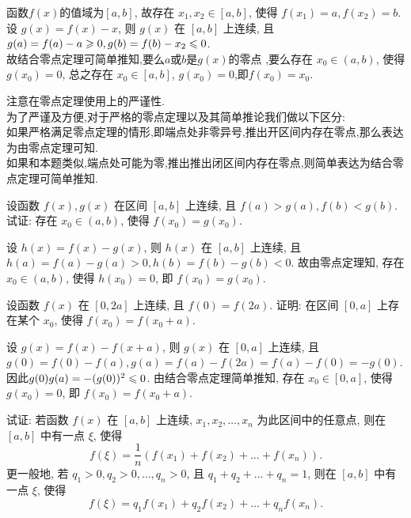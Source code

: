 \begin{solution}
    函数$f(x)$的值域为$[a,b]$, 故存在 $x_1, x_2 \in [a,b]$, 使得 $f(x_1) = a, f(x_2) = b$. 设 $g(x) = f(x) - x$, 则 $g(x)$ 在 $[a,b]$ 上连续, 且 $g(a) = f(a) - a \geqslant 0, g(b) = f(b) - x_2 \leqslant 0$. \\
    故结合零点定理可简单推知,要么$a$或$b$是$g(x)$的零点 ,要么存在 $x_0 \in (a,b)$, 使得 $g(x_0) = 0$, 总之存在 $x_0 \in [a,b]$, $g(x_0)=0$,即$f(x_0) = x_0$.

    \begin{remark}
    注意在零点定理使用上的严谨性.\\为了严谨及方便,对于严格的零点定理以及其简单推论我们做以下区分:\\
    如果严格满足零点定理的情形,即端点处非零异号,推出开区间内存在零点,那么表达为由零点定理可知.\\
    如果和本题类似,端点处可能为零,推出推出闭区间内存在零点,则简单表达为结合零点定理可简单推知.
\end{remark}
\end{solution}


\begin{exercise}[2.2.5]
    设函数 $f(x), g(x)$ 在区间 $[a,b]$ 上连续, 且 $f(a) > g(a), f(b) < g(b)$. 试证: 存在 $x_0 \in (a,b)$, 使得 $f(x_0)=g(x_0)$.
\end{exercise}

\begin{solution}
    设 $h(x) = f(x) - g(x)$, 则 $h(x)$ 在 $[a,b]$ 上连续, 且 $h(a) = f(a) - g(a) > 0, h(b) = f(b) - g(b) < 0$. 故由零点定理知, 存在 $x_0 \in (a,b)$, 使得 $h(x_0) = 0$, 即 $f(x_0) = g(x_0)$.
\end{solution}


\begin{exercise}[2.2.6]
    设函数 $f(x)$ 在 $[0, 2a]$ 上连续, 且 $f(0)=f(2a)$. 证明: 在区间 $[0,a]$ 上存在某个 $x_0$, 使得 $f(x_0) = f(x_0+a)$.
\end{exercise}

\begin{solution}
    设 $g(x) = f(x) - f(x+a)$, 则 $g(x)$ 在 $[0,a]$ 上连续, 且 $g(0) = f(0) - f(a), g(a) = f(a) - f(2a) = f(a) - f(0) = -g(0)$. 因此$g(0) g(a) = -(g(0))^2 \leqslant 0$. 由结合零点定理简单推知, 存在 $x_0 \in [0,a]$, 使得 $g(x_0) = 0$, 即 $f(x_0) = f(x_0+a)$.
\end{solution}

\begin{exercise}[2.2.7]
    试证: 若函数 $f(x)$ 在 $[a,b]$ 上连续, $x_1, x_2, \dots, x_n$ 为此区间中的任意点, 则在 $[a,b]$ 中有一点 $\xi$, 使得
    $$ f(\xi) = \frac{1}{n}(f(x_1)+f(x_2)+\dots+f(x_n)). $$
    更一般地, 若 $q_1 > 0, q_2 > 0, \dots, q_n > 0$, 且 $q_1+q_2+\dots+q_n=1$, 则在 $[a,b]$ 中有一点 $\xi$, 使得
    $$ f(\xi) = q_1f(x_1)+q_2f(x_2)+\dots+q_nf(x_n). $$
\end{exercise}


